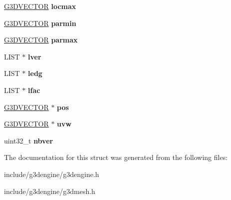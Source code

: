 \begin{DoxyCompactItemize}
\hyperlink{structG3DVECTOR}{G3\+D\+V\+E\+C\+T\+OR} {\bfseries locmax}
\item 
\mbox{\label{struct__G3DFFD_a67c2e787a319b6bb75c194ac140eeb12}} 
\hyperlink{structG3DVECTOR}{G3\+D\+V\+E\+C\+T\+OR} {\bfseries parmin}
\item 
\mbox{\label{struct__G3DFFD_accff857321abaa262377c7188f45eb5b}} 
\hyperlink{structG3DVECTOR}{G3\+D\+V\+E\+C\+T\+OR} {\bfseries parmax}
\item 
\mbox{\label{struct__G3DFFD_abea0b1f70233530df7d3596e8adbf586}} 
L\+I\+ST $\ast$ {\bfseries lver}
\item 
\mbox{\label{struct__G3DFFD_a98f4d04506e65541b8a9d52967969e82}} 
L\+I\+ST $\ast$ {\bfseries ledg}
\item 
\mbox{\label{struct__G3DFFD_a6488defa23520bf9b8806f1cfa83ee15}} 
L\+I\+ST $\ast$ {\bfseries lfac}
\item 
\mbox{\label{struct__G3DFFD_acde7d7c332293701e9148d930bf4e48e}} 
\hyperlink{structG3DVECTOR}{G3\+D\+V\+E\+C\+T\+OR} $\ast$ {\bfseries pos}
\item 
\mbox{\label{struct__G3DFFD_a8a3a4f35ad7440ac48c87a42f8e7b98d}} 
\hyperlink{structG3DVECTOR}{G3\+D\+V\+E\+C\+T\+OR} $\ast$ {\bfseries uvw}
\item 
\mbox{\label{struct__G3DFFD_a7383439cc65410e15d6ba98742de1741}} 
uint32\+\_\+t {\bfseries nbver}
\end{DoxyCompactItemize}


The documentation for this struct was generated from the following files\+:\begin{DoxyCompactItemize}
\item 
include/g3dengine/g3dengine.\+h\item 
include/g3dengine/g3dmesh.\+h\end{DoxyCompactItemize}
